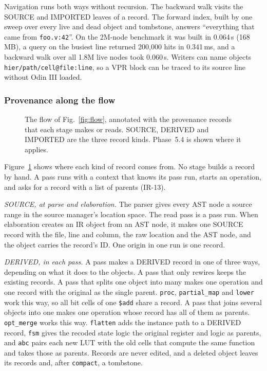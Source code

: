 \documentclass[conference]{IEEEtran}
\newcommand{\code}[1]{\texttt{#1}}
\begin{document}
Navigation runs both ways without recursion. The backward walk visits the SOURCE and IMPORTED
leaves of a record. The forward index, built by one sweep over every live and dead object and
tombstone, answers ``everything that came from \code{foo.v:42}''. On the 2M-node benchmark it
was built in 0.064\,s (168\,MB), a query on the busiest line returned 200,000 hits in
0.341\,ms, and a backward walk over all 1.8M live nodes took 0.060\,s. Writers can name objects
\code{hier/path/cell@file:line}, so a VPR block can be traced to its source line without Odin III
loaded.

\subsubsection*{Provenance along the flow}

\begin{figure}[t]
\centering
\odinfit{\textwidth}{}
\caption{The flow of Fig.~\ref{fig:flow}, annotated with the provenance records that each stage
makes or reads. SOURCE, DERIVED and IMPORTED are the three record kinds. Phase~5.4 is
shown where it applies.}
\label{fig:flow-prov}
\end{figure}

Figure~\ref{fig:flow-prov} shows where each kind of record comes from. No stage builds a record by
hand. A pass runs with a context that knows its pass run, starts an operation, and asks for a
record with a list of parents (IR-13).

\emph{SOURCE, at parse and elaboration.} The parser gives every AST node a source range in the
source manager's location space. The read pass is a pass run. When elaboration creates an IR
object from an AST node, it makes one SOURCE record with the file, line and column, the raw
location and the AST node, and the object carries the record's ID. One origin in one run is one
record.

\emph{DERIVED, in each pass.} A pass makes a DERIVED record in one of three ways, depending on
what it does to the objects. A pass that only rewires keeps the existing records. A pass that
splits one object into many makes one operation and one record with the original as the single
parent. \code{proc}, \code{partial\_map} and \code{lower} work this way, so all bit cells of one
\code{\$add} share a record. A pass that joins several objects into one makes one operation whose
record has all of them as parents. \code{opt\_merge} works this way. \code{flatten} adds the
instance path to a DERIVED record, \code{fsm} gives the recoded state logic the original register
and logic as parents, and \code{abc} pairs each new LUT with the old cells that compute the same
function and takes those as parents. Records are never edited, and a deleted object leaves its
records and, after \code{compact}, a tombstone.
\end{document}

